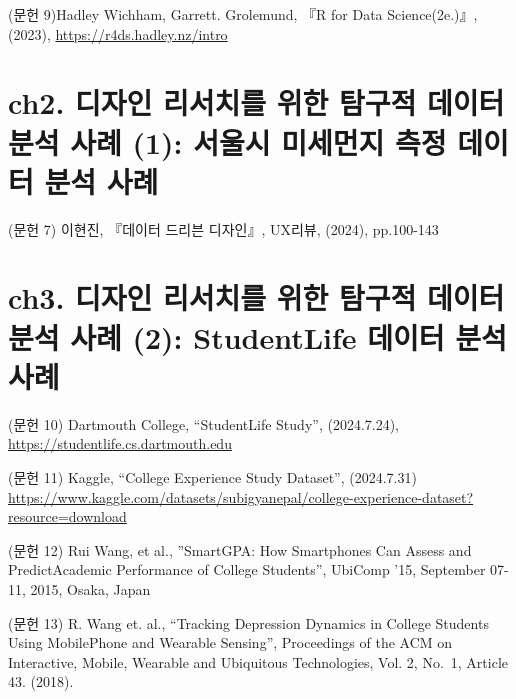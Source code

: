 \documentclass[
  letterpaper,
]{book}
\begin{document}

(문헌 9)Hadley Wichham, Garrett. Grolemund, 『R for Data Science(2e.)』,
(2023), \url{https://r4ds.hadley.nz/intro}

\section*{ch2. 디자인 리서치를 위한 탐구적 데이터 분석 사례 (1): 서울시
미세먼지 측정 데이터 분석
사례}\label{ch2.-uxb514uxc790uxc778-uxb9acuxc11cuxce58uxb97c-uxc704uxd55c-uxd0d0uxad6cuxc801-uxb370uxc774uxd130-uxbd84uxc11d-uxc0acuxb840-1-uxc11cuxc6b8uxc2dc-uxbbf8uxc138uxba3cuxc9c0-uxce21uxc815-uxb370uxc774uxd130-uxbd84uxc11d-uxc0acuxb840}


(문헌 7) 이현진, 『데이터 드리븐 디자인』, UX리뷰, (2024), pp.100-143

\section*{ch3. 디자인 리서치를 위한 탐구적 데이터 분석 사례 (2):
StudentLife 데이터 분석
사례}\label{ch3.-uxb514uxc790uxc778-uxb9acuxc11cuxce58uxb97c-uxc704uxd55c-uxd0d0uxad6cuxc801-uxb370uxc774uxd130-uxbd84uxc11d-uxc0acuxb840-2-studentlife-uxb370uxc774uxd130-uxbd84uxc11d-uxc0acuxb840}


(문헌 10) Dartmouth College, ``StudentLife Study'', (2024.7.24),
\href{https://studentlife.cs.dartmouth.edu/}{https://studentlife.cs.dartmouth.edu}

(문헌 11) Kaggle, ``College Experience Study Dataset'', (2024.7.31)
\url{https://www.kaggle.com/datasets/subigyanepal/college-experience-dataset?resource=download}

(문헌 12) Rui Wang, et al., ''SmartGPA: How Smartphones Can Assess and
PredictAcademic Performance of College Students'', UbiComp '15,
September 07-11, 2015, Osaka, Japan

(문헌 13) R. Wang et. al., ``Tracking Depression Dynamics in College
Students Using MobilePhone and Wearable Sensing'', Proceedings of the
ACM on Interactive, Mobile, Wearable and Ubiquitous Technologies, Vol.
2, No.~1, Article 43. (2018).
\end{document}
